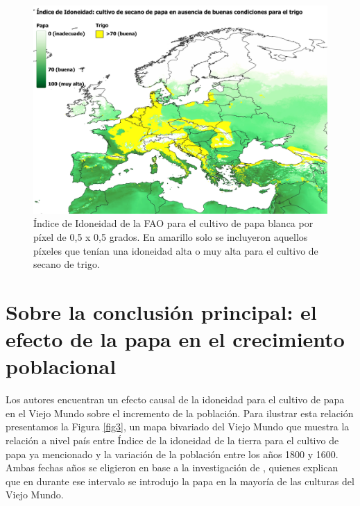 \documentclass[10.5pt]{article}   %
\begin{document}
\begin{figure}[H]
\centering
\includegraphics[scale=0.6]{imgs/wpot_wheat.png}
\caption{Índice de Idoneidad de la FAO para el cultivo de papa blanca por píxel de 0,5 x 0,5 grados. En amarillo solo se incluyeron aquellos píxeles que tenían una idoneidad alta o muy alta para el cultivo de secano de trigo.}
    \label{fig2}
\end{figure}


\section*{Sobre la conclusión principal: el efecto de la papa en el crecimiento poblacional}
Los autores encuentran un efecto causal de la idoneidad para el cultivo de papa en el Viejo Mundo sobre el incremento de la población. Para ilustrar esta relación presentamos la Figura \ref{fig3}, un mapa bivariado del Viejo Mundo que muestra la relación a nivel país entre Índice de la idoneidad de la tierra para el cultivo de papa ya mencionado y la variación de la población entre los años 1800 y 1600. Ambas fechas años se eligieron en base a la investigación de \cite{nunn2011potato}, quienes explican que en durante ese intervalo se introdujo la papa en la mayoría de las culturas del Viejo Mundo.
\end{document}

